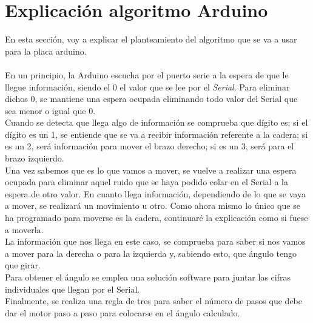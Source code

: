 \documentclass[11pt]{article}
\begin{document}
\begin{enumerate}
\end{enumerate}

\section{Explicación algoritmo Arduino}
En esta sección, voy a explicar el planteamiento del algoritmo que se va a usar para la placa arduino.\\\\
En un principio, la Arduino escucha por el puerto serie a la espera de que le llegue información, siendo el 0 el valor que se lee por el \textit{Serial}. Para eliminar dichos 0, se mantiene una espera ocupada eliminando todo valor del Serial que sea menor o igual que 0.\\
Cuando se detecta que llega algo de información se comprueba que dígito es; si el dígito es un 1, se entiende que se va a recibir información referente a la cadera; si es un 2, será información para mover el brazo derecho; si es un 3, será para el brazo izquierdo.\\
Una vez sabemos que es lo que vamos a mover, se vuelve a realizar una espera ocupada para eliminar aquel ruido que se haya podido colar en el Serial a la espera de otro valor. En cuanto llega información, dependiendo de lo que se vaya a mover, se realizará un movimiento u otro. Como ahora mismo lo único que se ha programado para moverse es la cadera, continuaré la explicación como si fuese a moverla.\\
La información que nos llega en este caso, se comprueba para saber si nos vamos a mover para la derecha o para la izquierda y, sabiendo esto, que ángulo tengo que girar.\\
Para obtener el ángulo se emplea una solución software para juntar las cifras individuales que llegan por el Serial.\\
Finalmente, se realiza una regla de tres para saber el número de pasos que debe dar el motor paso a paso para colocarse en el ángulo calculado.
\end{document}
